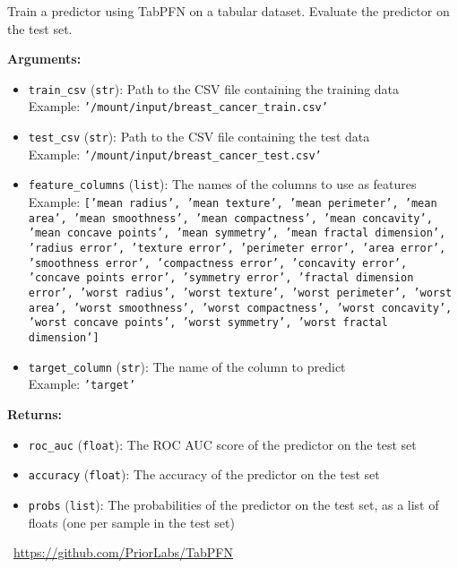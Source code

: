 \label{app:tasks:tabular}
\begin{tcolorbox}[title={\texttt{tabpfn\_predict}}]
Train a predictor using TabPFN on a tabular dataset. Evaluate the predictor on the test set.

\vspace{.5em}
\textbf{Arguments:}
\begin{itemize}[topsep=0pt,parsep=-1pt,partopsep=0pt]
\item \texttt{train\_csv} (\texttt{str}): Path to the CSV file containing the training data\\  Example: \texttt{'/mount/input/breast\_cancer\_train.csv'}
\item \texttt{test\_csv} (\texttt{str}): Path to the CSV file containing the test data\\  Example: \texttt{'/mount/input/breast\_cancer\_test.csv'}
\item \texttt{feature\_columns} (\texttt{list}): The names of the columns to use as features\\  Example: \texttt{['mean radius', 'mean texture', 'mean perimeter', 'mean area', 'mean smoothness', 'mean compactness', 'mean concavity', 'mean concave points', 'mean symmetry', 'mean fractal dimension', 'radius error', 'texture error', 'perimeter error', 'area error', 'smoothness error', 'compactness error', 'concavity error', 'concave points error', 'symmetry error', 'fractal dimension error', 'worst radius', 'worst texture', 'worst perimeter', 'worst area', 'worst smoothness', 'worst compactness', 'worst concavity', 'worst concave points', 'worst symmetry', 'worst fractal dimension']}
\item \texttt{target\_column} (\texttt{str}): The name of the column to predict\\  Example: \texttt{'target'}
\end{itemize}

\vspace{.5em}
\textbf{Returns:} \begin{itemize}[topsep=0pt,parsep=-1pt,partopsep=0pt]
\item \texttt{roc\_auc} (\texttt{float}): The ROC AUC score of the predictor on the test set
\item \texttt{accuracy} (\texttt{float}): The accuracy of the predictor on the test set
\item \texttt{probs} (\texttt{list}): The probabilities of the predictor on the test set, as a list of floats (one per sample in the test set)
\end{itemize}
\tcblower
\setlength{\hangindent}{\widthof{\faGithub~}}
\faGithub~\url{https://github.com/PriorLabs/TabPFN}

\vspace{.5em}\setlength{\hangindent}{\widthof{\faFile*[regular]~}}\faFile*[regular]~


\end{tcolorbox}

